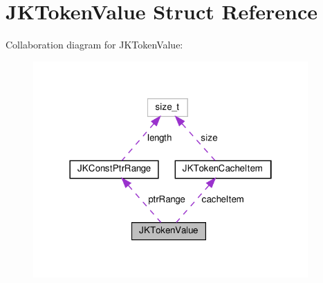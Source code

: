 \hypertarget{structJKTokenValue}{}\section{J\+K\+Token\+Value Struct Reference}
\label{structJKTokenValue}


Collaboration diagram for J\+K\+Token\+Value\+:
\nopagebreak
\begin{figure}[H]
\begin{center}
\leavevmode
\includegraphics[width=298pt]{structJKTokenValue__coll__graph}
\end{center}
\end{figure}
